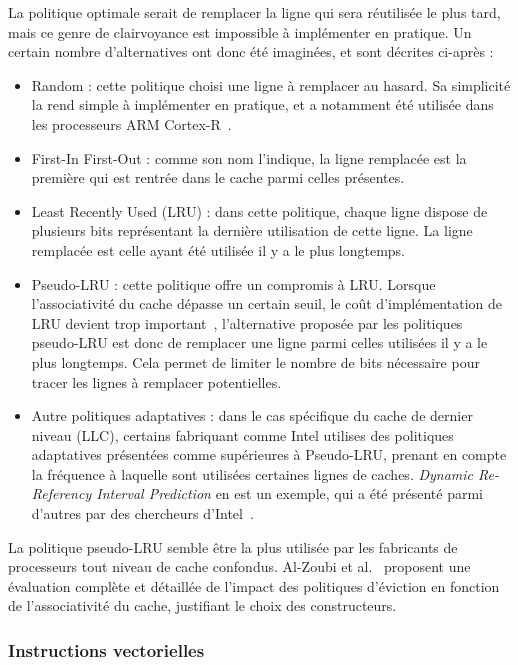 La politique optimale serait de remplacer la ligne qui sera réutilisée le plus tard, mais ce genre de clairvoyance est impossible à implémenter en pratique.
Un certain nombre d'alternatives ont donc été imaginées, et sont décrites ci-après :
\begin{itemize}
  \item Random : cette politique choisi une ligne à remplacer au hasard. Sa simplicité la rend simple à implémenter en pratique, et a notamment été utilisée dans les processeurs ARM Cortex-R~\cite{ARM-Cortex-R}.
  \item First-In First-Out : comme son nom l'indique, la ligne remplacée est la première qui est rentrée dans le cache parmi celles présentes.
  \item Least Recently Used (LRU) : dans cette politique, chaque ligne dispose de plusieurs bits représentant la dernière utilisation de cette ligne. La ligne remplacée est celle ayant été utilisée il y a le plus longtemps.
  \item Pseudo-LRU : cette politique offre un compromis à LRU.
Lorsque l'associativité du cache dépasse un certain seuil, le coût d'implémentation de LRU devient trop important~\cite{Kedzierski2010}, l'alternative proposée par les politiques pseudo-LRU est donc de remplacer une ligne parmi celles utilisées il y a le plus longtemps.
Cela permet de limiter le nombre de bits nécessaire pour tracer les lignes à remplacer potentielles.
  \item Autre politiques adaptatives : dans le cas spécifique du cache de dernier niveau (LLC), certains fabriquant comme Intel utilises des politiques adaptatives présentées comme supérieures à Pseudo-LRU, prenant en compte la fréquence à laquelle sont utilisées certaines lignes de caches.
    \emph{Dynamic Re-Referency Interval Prediction} en est un exemple, qui a été présenté parmi d'autres par des chercheurs d'Intel~\cite{Jaleel2010}.
\end{itemize}

La politique pseudo-LRU semble être la plus utilisée par les fabricants de processeurs tout niveau de cache confondus. Al-Zoubi et al.~\cite{Al-Zoubi2004} proposent une évaluation complète et détaillée de l'impact des politiques d'éviction en fonction de l'associativité du cache, justifiant le choix des constructeurs.


\subsubsection{Instructions vectorielles}\label{sec:context:numa:simd}

